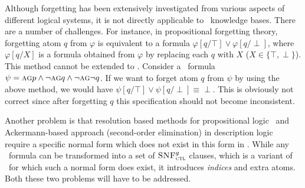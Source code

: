 \documentclass{article}
\begin{document}
Although forgetting has been extensively investigated from various aspects of different logical systems,
it is not directly applicable to \CTL\ knowledge bases.
There are a number of challenges. For instance, in propositional forgetting theory, forgetting atom $q$ from $\varphi$ is equivalent to a formula $\varphi[q/\top] \vee \varphi[q/\perp]$, where $\varphi[q/X]$ is a formula obtained from $\varphi$ by replacing each $q$ with $X$ ($X\in \{\top, \perp\}$).
This method cannot be extended to \CTL. Consider a \CTL\ formula $\psi=\textsc{a}\textsc{g} p \wedge \neg \textsc{a}\textsc{g} q \wedge \neg \textsc{a}\textsc{g} \neg q$. If we want to forget
atom $q$ from $\psi$ by using the above method, we would have $\psi[q/\top] \vee \psi[q/\perp] \equiv \perp$. This is obviously not correct since after forgetting $q$ this specification should not become inconsistent.


Another problem is that resolution based methods for propositional logic~\cite{lin1994forget,Yisong:2015:arx} and Ackermann-based approach (second-order elimination) in description logic~\cite{Zhao:2017:IJCAI} require a specific normal form which does not exist in this form in \CTL.
While any \CTL\ formula can be transformed into a set of ${\textsc{SNF}_{\textsc{ctl}}^g}$ clauses, which is a variant of \CTL\ for which such a normal form does exist, it introduces \emph{indices} and extra atoms. Both these two problems will have to be addressed.
\end{document}
